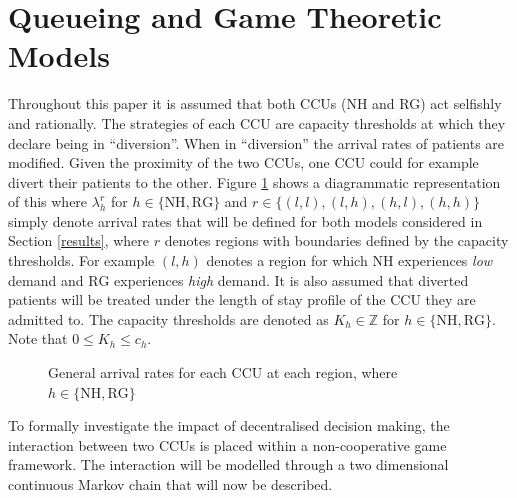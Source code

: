 \documentclass{article}
\newcommand{\NH}{\text{NH}}
\newcommand{\RG}{\text{RG}}
\begin{document}
\section{Queueing and Game Theoretic Models} \label{queueingandgamemodels}

Throughout this paper it is assumed that both CCUs (NH and RG) act selfishly and rationally.
The strategies of each CCU are capacity thresholds at which they declare being in ``diversion''. When in ``diversion'' the arrival rates of patients are modified.
Given the proximity of the two CCUs, one CCU could for example divert their patients to the other.
Figure \ref{arrivalrateregions} shows a diagrammatic representation of this where $\lambda_h^{r}$ for $h\in\{\NH, \RG\}$ and $r\in\{(l,l), (l,h), (h,l), (h,h)\}$ simply denote arrival rates that will be defined for both models considered in Section \ref{results}, where $r$ denotes regions with boundaries defined by the capacity thresholds.
For example $(l,h)$ denotes a region for which $\NH$ experiences \textit{low} demand and $\RG$ experiences \textit{high} demand.
It is also assumed that diverted patients will be treated under the length of stay profile of the CCU they are admitted to.
The capacity thresholds are denoted as $K_{h}\in\mathbb{Z}$ for $h\in\{\NH,\RG\}$. Note that $0\leq K_h\leq c_h$.

\begin{figure}[!htbp]
\begin{center}
\caption{General arrival rates for each CCU at each region, where $h\in\{\NH, \RG\}$} \label{arrivalrateregions}
\end{center}
\end{figure}

To formally investigate the impact of decentralised decision making, the interaction between two CCUs is placed within a non-cooperative game framework.
The interaction will be modelled through a two dimensional continuous Markov chain that will now be described.
\end{document}

